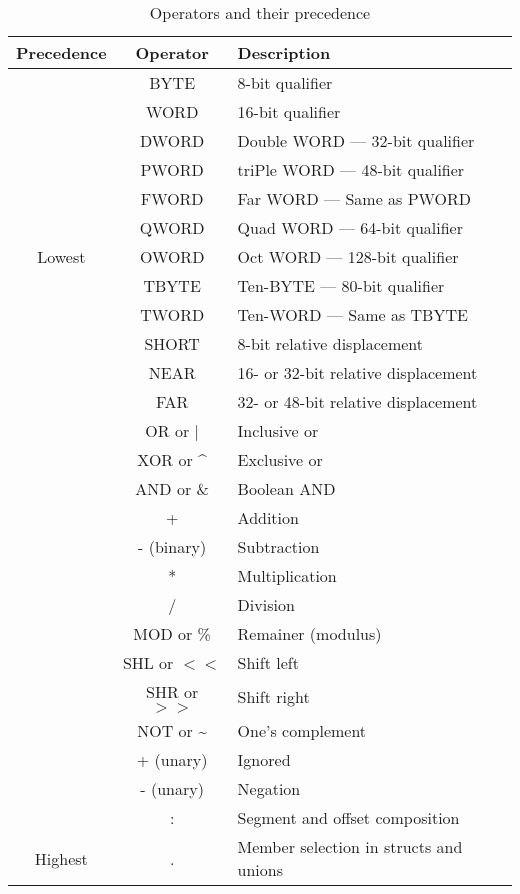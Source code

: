 \documentclass[a4paper,draft,12pt]{book}
\begin{document}
\begin{table}[h]
\begin{center}
\begin{tabular}[h]{ccl}
\hline
Precedence & Operator & Description\\
\hline
                   & BYTE & 8-bit qualifier\\
                   & WORD & 16-bit qualifier\\
                   & DWORD & Double WORD --- 32-bit qualifier\\
                   & PWORD & triPle WORD --- 48-bit qualifier\\
                   & FWORD & Far WORD --- Same as PWORD\\
                   & QWORD & Quad WORD --- 64-bit qualifier\\
Lowest             & OWORD & Oct WORD --- 128-bit qualifier\\
                   & TBYTE & Ten-BYTE --- 80-bit qualifier\\
                   & TWORD & Ten-WORD --- Same as TBYTE\protect{\footnotemark}\\
                   & SHORT & 8-bit relative displacement\\
                   & NEAR & 16- or 32-bit relative displacement\\
                   & FAR & 32- or 48-bit relative displacement\\
\hline
                   & OR or $\vert$ & Inclusive or\\
                   & XOR or \^{} & Exclusive or\\
\hline
                   & AND or \& & Boolean AND\\
\hline
                   & + & Addition\\
                   & - (binary) & Subtraction\\
\hline
                   & * & Multiplication\\
                   & / & Division\\
                   & MOD or \% & Remainer (modulus)\\
                   & SHL or $< <$ & Shift left\\
                   & SHR or $> >$ & Shift right\\
\hline
                   & NOT or \~{}& One's complement\\
                   & + (unary) & Ignored\\
                   & - (unary) & Negation\\
\hline
                   & : & Segment and offset composition\\
\hline
Highest            & . & Member selection in structs and unions\\
\hline
\end{tabular}
\caption{Operators and their precedence}
\label{OPTAB}
\end{center}
\end{table}
\end{document}
